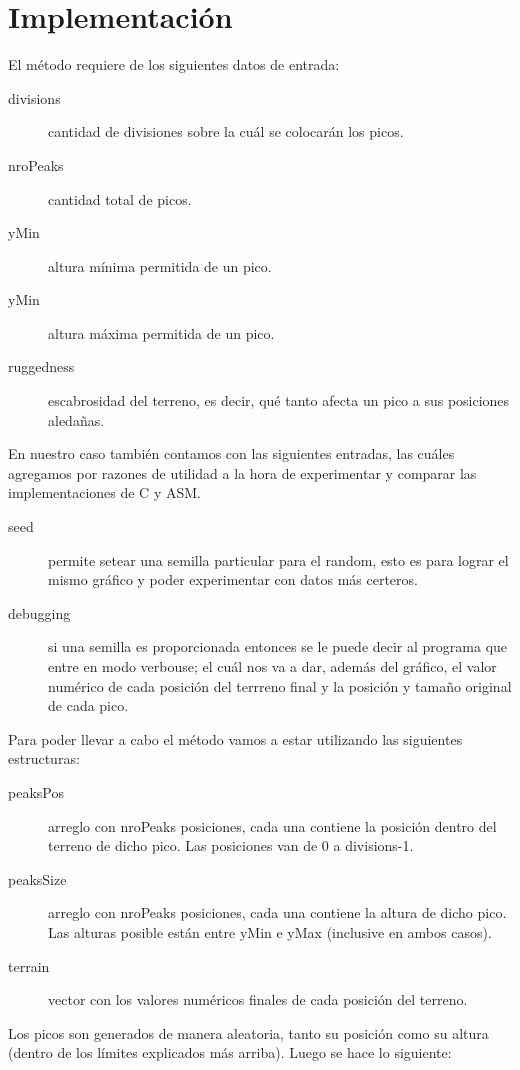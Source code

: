 \section{Implementación}
El método requiere de los siguientes datos de entrada:
\begin{description}
\item[divisions] cantidad de divisiones sobre la cuál se colocarán los picos.
\item[nroPeaks] cantidad total de picos.
\item[yMin] altura mínima permitida de un pico.
\item[yMin] altura máxima permitida de un pico.
\item[ruggedness] escabrosidad del terreno, es decir, qué tanto afecta un pico a sus posiciones aledañas.
\end{description}
\smallskip

En nuestro caso también contamos con las siguientes entradas, las cuáles agregamos por razones de utilidad a la hora de experimentar y comparar las implementaciones de C y ASM.
\begin{description}
\item[seed] permite setear una semilla particular para el random, esto es para lograr el mismo gráfico y poder experimentar con datos más certeros.
\item[debugging] si una semilla es proporcionada entonces se le puede decir al programa que entre en modo verbouse; el cuál nos va a dar, además del gráfico, el valor numérico de cada posición del terrreno final y la posición y tamaño original de cada pico.
\end{description}
\smallskip

Para poder llevar a cabo el método vamos a estar utilizando las siguientes estructuras:
\begin{description}
\item[peaksPos] arreglo con nroPeaks posiciones, cada una contiene la posición dentro del terreno de dicho pico. Las posiciones van de 0 a divisions-1.
\item[peaksSize] arreglo con nroPeaks posiciones, cada una contiene la altura de dicho pico. Las alturas posible están entre yMin e yMax (inclusive en ambos casos).
\item[terrain] vector con los valores numéricos finales de cada posición del terreno.
\end{description}
\smallskip

Los picos son generados de manera aleatoria, tanto su posición como su altura (dentro de los límites explicados más arriba). Luego se hace lo siguiente:

